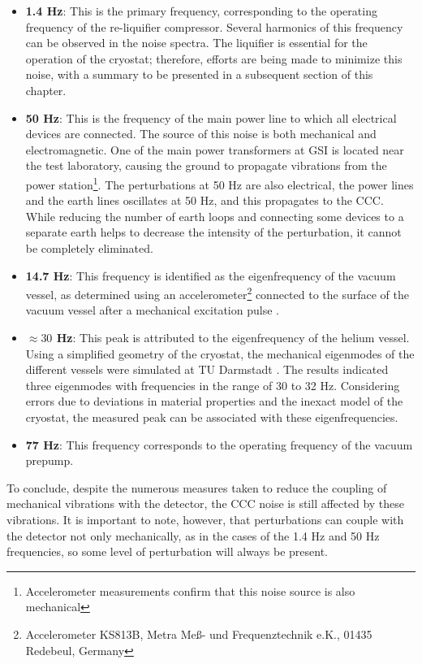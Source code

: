 \documentclass[12pt,a4paper]{report}
\begin{document}
       	\begin{itemize}
       		\item \textbf{1.4 Hz}: This is the primary frequency, corresponding to the operating frequency of the re-liquifier compressor. Several harmonics of this frequency can be observed in the noise spectra. The liquifier is essential for the operation of the cryostat; therefore, efforts are being made to minimize this noise, with a summary to be presented in a subsequent section of this chapter.
       		\item \textbf{50 Hz}: This is the frequency of the main power line to which all electrical devices are connected. The source of this noise is both mechanical and electromagnetic. One of the main power transformers at GSI is located near the test laboratory, causing the ground to propagate vibrations from the power station\footnote{Accelerometer measurements confirm that this noise source is also mechanical}. The perturbations at 50 Hz are also electrical, the power lines and the earth lines oscillates at 50 Hz, and this propagates to the CCC. While reducing the number of earth loops and connecting some devices to a separate earth helps to decrease the intensity of the perturbation, it cannot be completely eliminated.
       		\item \textbf{14.7 Hz}: This frequency is identified as the eigenfrequency of the vacuum vessel, as determined using an accelerometer\footnote{Accelerometer KS813B, Metra Meß- und Frequenztechnik e.K., 01435 Redebeul, Germany} connected to the surface of the vacuum vessel after a mechanical excitation pulse \cite{Ucar2020}.
       		\item \textbf{$\approx 30$ Hz}: This peak is attributed to the eigenfrequency of the helium vessel. Using a simplified geometry of the cryostat, the mechanical eigenmodes of the different vessels were simulated at TU Darmstadt \cite{Marsic2019cryostat}. The results indicated three eigenmodes with frequencies in the range of 30 to 32 Hz. Considering errors due to deviations in material properties and the inexact model of the cryostat, the measured peak can be associated with these eigenfrequencies.
       		\item \textbf{77 Hz}: This frequency corresponds to the operating frequency of the vacuum prepump.
       	\end{itemize}
       	To conclude, despite the numerous measures taken to reduce the coupling of mechanical vibrations with the detector, the CCC noise is still affected by these vibrations. It is important to note, however, that perturbations can couple with the detector not only mechanically, as in the cases of the 1.4 Hz and 50 Hz frequencies, so some level of perturbation will always be present.
       	
\end{document}
